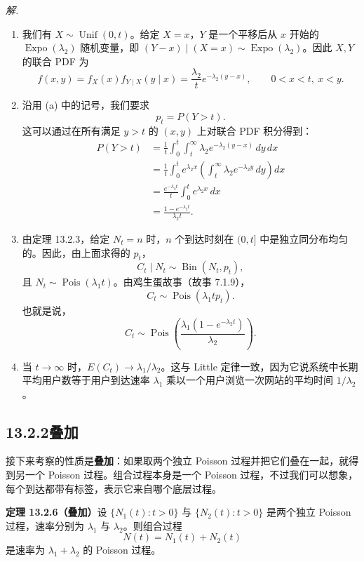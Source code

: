 \documentclass[UTF8, 12pt, fontset=fandol, oneside]{ctexart}
\begin{document}
\noindent\textit{解.}\quad
\begin{enumerate}
  \item 我们有 $X\sim\operatorname{Unif}(0,t)$。给定 $X=x$，$Y$ 是一个平移后从 $x$ 开始的 $\operatorname{Expo}(\lambda_2)$ 随机变量，即 $(Y-x)\mid (X=x)\sim\operatorname{Expo}(\lambda_2)$。因此 $X,Y$ 的联合 PDF 为
  \[
    f(x,y)=f_X(x)f_{Y\mid X}(y\mid x)
    =\frac{\lambda_2}{t}e^{-\lambda_2(y-x)},\qquad 0<x<t,\ x<y.
  \]
\item 沿用 (a) 中的记号，我们要求
\[
  p_t=P(Y>t).
\]
这可以通过在所有满足 $y>t$ 的 $(x,y)$ 上对联合 PDF 积分得到：
\[
\begin{aligned}
  P(Y>t)
  &=\frac1t\int_0^t\int_t^\infty \lambda_2 e^{-\lambda_2(y-x)}\,dy\,dx\\
  &=\frac1t\int_0^t e^{\lambda_2 x}
    \left(\int_t^\infty \lambda_2 e^{-\lambda_2 y}\,dy\right)dx\\
  &=\frac{e^{-\lambda_2 t}}{t}\int_0^t e^{\lambda_2 x}\,dx\\
  &=\frac{1-e^{-\lambda_2 t}}{\lambda_2 t}.
\end{aligned}
\]

\item 由定理 13.2.3，给定 $N_t=n$ 时，$n$ 个到达时刻在 $(0,t]$ 中是独立同分布均匀的。因此，由上面求得的 $p_t$，
\[
  C_t\mid N_t\sim \operatorname{Bin}(N_t,p_t),
\]
且 $N_t\sim\operatorname{Pois}(\lambda_1 t)$。由鸡生蛋故事（故事 7.1.9），
\[
  C_t\sim\operatorname{Pois}(\lambda_1tp_t).
\]
也就是说，
\[
  C_t\sim \operatorname{Pois}\left(\frac{\lambda_1(1-e^{-\lambda_2t})}{\lambda_2}\right).
\]

\item 当 $t\to\infty$ 时，$E(C_t)\to\lambda_1/\lambda_2$。这与 Little 定律一致，因为它说系统中长期平均用户数等于用户到达速率 $\lambda_1$ 乘以一个用户浏览一次网站的平均时间 $1/\lambda_2$。
\end{enumerate}

\subsection*{13.2.2\quad 叠加}

接下来考察的性质是\textbf{叠加}：如果取两个独立 Poisson 过程并把它们叠在一起，就得到另一个 Poisson 过程。组合过程本身是一个 Poisson 过程，不过我们可以想象，每个到达都带有标签，表示它来自哪个底层过程。

\noindent\textbf{定理 13.2.6（叠加）}\quad 设 $\{N_1(t):t>0\}$ 与 $\{N_2(t):t>0\}$ 是两个独立 Poisson 过程，速率分别为 $\lambda_1$ 与 $\lambda_2$。则组合过程
\[
  N(t)=N_1(t)+N_2(t)
\]
是速率为 $\lambda_1+\lambda_2$ 的 Poisson 过程。
\end{document}
